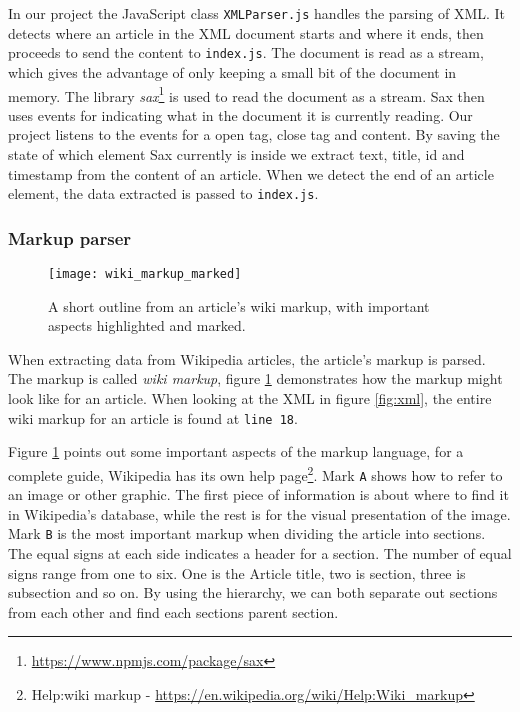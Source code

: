 In our project the JavaScript class \texttt{XMLParser.js} handles the parsing of XML. It detects where an article in the XML document starts and where it ends, then proceeds to send the content to \texttt{index.js}. The document is read as a stream, which gives the advantage of only keeping a small bit of the document in memory. The library \textit{sax}\footnote{\url{https://www.npmjs.com/package/sax}} is used to read the document as a stream. Sax then uses events for indicating what in the document it is currently reading. Our project listens to the events for a open tag, close tag and content. By saving the state of which element Sax currently is inside we extract text, title, id and timestamp from the content of an article. When we detect the end of an article element, the data extracted is passed to \texttt{index.js}.

\subsubsection{Markup parser}

\begin{figure}[h]
\caption{A short outline from an article's wiki markup, with important aspects highlighted and marked. }
\texttt{[image: wiki\_markup\_marked]}
\label{fig:wiki_markup}
\end{figure}

When extracting data from Wikipedia articles, the article's markup is parsed. The markup is called \textit{wiki markup}, figure \ref{fig:wiki_markup} demonstrates how the markup might look like for an article. When looking at the XML in figure \ref{fig:xml}, the entire wiki markup for an article is found at \texttt{line 18}.

Figure \ref{fig:wiki_markup} points out some important aspects of the markup language, for a complete guide, Wikipedia has its own help page\footnote{Help:wiki markup - \url{https://en.wikipedia.org/wiki/Help:Wiki_markup}}. Mark \texttt{A} shows how to refer to an image or other graphic. The first piece of information is about where to find it in Wikipedia's database, while the rest is for the visual presentation of the image. Mark \texttt{B} is the most important markup when dividing the article into sections. The equal signs at each side indicates a header for a section. The number of equal signs range from one to six. One is the Article title, two is section, three is subsection and so on. By using the hierarchy, we can both separate out sections from each other and find each sections parent section.

